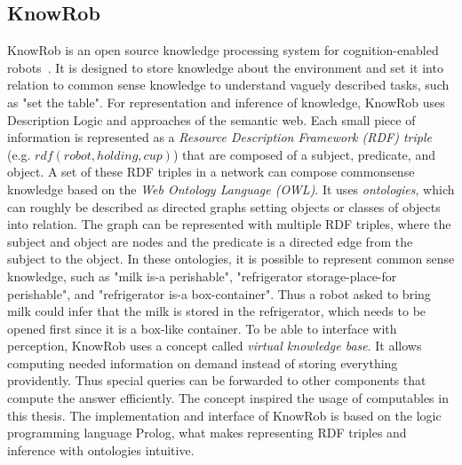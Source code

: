 \documentclass[a4paper,11pt]{article}
\begin{document}
\subsection{KnowRob}
\label{sec:knowrob}
KnowRob is an open source knowledge processing system for
cognition-enabled robots~\cite{KnowRob,KnowRob-Representation}. It is
designed to store knowledge about the environment and set it into
relation to common sense knowledge to understand vaguely described
tasks, such as "set the table". For representation and inference of knowledge,
KnowRob uses Description Logic and approaches of the semantic web.
Each small piece of
information is represented as a \emph{Resource Description Framework
  (RDF) triple} (e.g. $rdf(robot, holding, cup)$) that are composed
of a subject, predicate, and object. A set of these RDF triples in a
network can compose commonsense knowledge based on the
\emph{Web Ontology Language (OWL)}. It uses
\emph{ontologies}, which can roughly be described as directed graphs
setting objects or classes of objects into relation. The graph can be
represented with multiple RDF triples, where the subject and object
are nodes and the predicate is a directed edge from the subject to the
object. In these ontologies, it is possible to represent common sense
knowledge, such as "milk is-a perishable", "refrigerator
storage-place-for perishable", and "refrigerator is-a
box-container". Thus a robot asked to bring milk could infer that the
milk is stored in the refrigerator, which needs to be opened first
since it is a box-like container. To be able to interface with
perception, KnowRob uses a concept called
\emph{virtual knowledge base}. It allows computing needed information
on demand instead of storing everything providently. Thus special
queries can be forwarded to other components that compute the answer
efficiently.
The concept inspired the usage of computables in this thesis.  The
implementation and interface of KnowRob is based on the logic
programming language Prolog, what makes representing RDF triples and
inference with ontologies intuitive.
\end{document}
